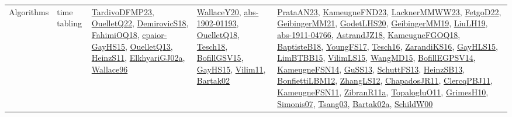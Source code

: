 {\begin{longtable}{lp{3cm}>{\raggedright}p{6cm}>{\raggedright}p{6cm}p{8cm}}
Algorithms & time tabling & \href{papers/TardivoDFMP23.pdf}{TardivoDFMP23}\cite{TardivoDFMP23}, \href{papers/OuelletQ22.pdf}{OuelletQ22}\cite{OuelletQ22}, \href{papers/DemirovicS18.pdf}{DemirovicS18}\cite{DemirovicS18}, \href{articles/FahimiOQ18.pdf}{FahimiOQ18}\cite{FahimiOQ18}, \href{papers/cpaior-GayHS15.pdf}{cpaior-GayHS15}\cite{cpaior-GayHS15}, \href{papers/OuelletQ13.pdf}{OuelletQ13}\cite{OuelletQ13}, \href{papers/HeinzS11.pdf}{HeinzS11}\cite{HeinzS11}, \href{papers/ElkhyariGJ02a.pdf}{ElkhyariGJ02a}\cite{ElkhyariGJ02a}, \href{articles/Wallace96.pdf}{Wallace96}\cite{Wallace96} & \href{articles/WallaceY20.pdf}{WallaceY20}\cite{WallaceY20}, \href{articles/abs-1902-01193.pdf}{abs-1902-01193}\cite{abs-1902-01193}, \href{papers/OuelletQ18.pdf}{OuelletQ18}\cite{OuelletQ18}, \href{papers/Tesch18.pdf}{Tesch18}\cite{Tesch18}, \href{papers/BofillGSV15.pdf}{BofillGSV15}\cite{BofillGSV15}, \href{papers/GayHS15.pdf}{GayHS15}\cite{GayHS15}, \href{papers/Vilim11.pdf}{Vilim11}\cite{Vilim11}, \href{papers/Bartak02.pdf}{Bartak02}\cite{Bartak02} & \href{articles/PrataAN23.pdf}{PrataAN23}\cite{PrataAN23}, \href{papers/KameugneFND23.pdf}{KameugneFND23}\cite{KameugneFND23}, \href{articles/LacknerMMWW23.pdf}{LacknerMMWW23}\cite{LacknerMMWW23}, \href{articles/FetgoD22.pdf}{FetgoD22}\cite{FetgoD22}, \href{papers/GeibingerMM21.pdf}{GeibingerMM21}\cite{GeibingerMM21}, \href{papers/GodetLHS20.pdf}{GodetLHS20}\cite{GodetLHS20}, \href{papers/GeibingerMM19.pdf}{GeibingerMM19}\cite{GeibingerMM19}, \href{papers/LiuLH19.pdf}{LiuLH19}\cite{LiuLH19}, \href{articles/abs-1911-04766.pdf}{abs-1911-04766}\cite{abs-1911-04766}, \href{papers/AstrandJZ18.pdf}{AstrandJZ18}\cite{AstrandJZ18}, \href{papers/KameugneFGOQ18.pdf}{KameugneFGOQ18}\cite{KameugneFGOQ18}, \href{articles/BaptisteB18.pdf}{BaptisteB18}\cite{BaptisteB18}, \href{papers/YoungFS17.pdf}{YoungFS17}\cite{YoungFS17}, \href{papers/Tesch16.pdf}{Tesch16}\cite{Tesch16}, \href{articles/ZarandiKS16.pdf}{ZarandiKS16}\cite{ZarandiKS16}, \href{papers/GayHLS15.pdf}{GayHLS15}\cite{GayHLS15}, \href{papers/LimBTBB15.pdf}{LimBTBB15}\cite{LimBTBB15}, \href{papers/VilimLS15.pdf}{VilimLS15}\cite{VilimLS15}, \href{articles/WangMD15.pdf}{WangMD15}\cite{WangMD15}, \href{papers/BofillEGPSV14.pdf}{BofillEGPSV14}\cite{BofillEGPSV14}, \href{articles/KameugneFSN14.pdf}{KameugneFSN14}\cite{KameugneFSN14}, \href{papers/GuSS13.pdf}{GuSS13}\cite{GuSS13}, \href{papers/SchuttFS13.pdf}{SchuttFS13}\cite{SchuttFS13}, \href{articles/HeinzSB13.pdf}{HeinzSB13}\cite{HeinzSB13}, \href{papers/BonfiettiLBM12.pdf}{BonfiettiLBM12}\cite{BonfiettiLBM12}, \href{papers/ZhangLS12.pdf}{ZhangLS12}\cite{ZhangLS12}, \href{papers/ChapadosJR11.pdf}{ChapadosJR11}\cite{ChapadosJR11}, \href{papers/ClercqPBJ11.pdf}{ClercqPBJ11}\cite{ClercqPBJ11}, \href{papers/KameugneFSN11.pdf}{KameugneFSN11}\cite{KameugneFSN11}, \href{papers/ZibranR11a.pdf}{ZibranR11a}\cite{ZibranR11a}, \href{articles/TopalogluO11.pdf}{TopalogluO11}\cite{TopalogluO11}, \href{papers/GrimesH10.pdf}{GrimesH10}\cite{GrimesH10}, \href{articles/Simonis07.pdf}{Simonis07}\cite{Simonis07}, \href{articles/Tsang03.pdf}{Tsang03}\cite{Tsang03}, \href{papers/Bartak02a.pdf}{Bartak02a}\cite{Bartak02a}, \href{articles/SchildW00.pdf}{SchildW00}\cite{SchildW00}\\

\end{longtable}}
